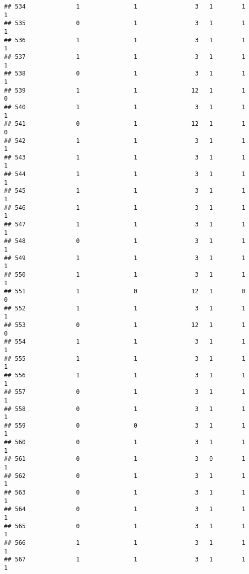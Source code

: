 \documentclass[]{article}
\begin{document}
\begin{verbatim}
## 534              1               1                3   1        1        1
## 535              0               1                3   1        1        1
## 536              1               1                3   1        1        1
## 537              1               1                3   1        1        1
## 538              0               1                3   1        1        1
## 539              1               1               12   1        1        0
## 540              1               1                3   1        1        1
## 541              0               1               12   1        1        0
## 542              1               1                3   1        1        1
## 543              1               1                3   1        1        1
## 544              1               1                3   1        1        1
## 545              1               1                3   1        1        1
## 546              1               1                3   1        1        1
## 547              1               1                3   1        1        1
## 548              0               1                3   1        1        1
## 549              1               1                3   1        1        1
## 550              1               1                3   1        1        1
## 551              1               0               12   1        0        0
## 552              1               1                3   1        1        1
## 553              0               1               12   1        1        0
## 554              1               1                3   1        1        1
## 555              1               1                3   1        1        1
## 556              1               1                3   1        1        1
## 557              0               1                3   1        1        1
## 558              0               1                3   1        1        1
## 559              0               0                3   1        1        1
## 560              0               1                3   1        1        1
## 561              0               1                3   0        1        1
## 562              0               1                3   1        1        1
## 563              0               1                3   1        1        1
## 564              0               1                3   1        1        1
## 565              0               1                3   1        1        1
## 566              1               1                3   1        1        1
## 567              1               1                3   1        1        1

\end{verbatim}
\end{document}

